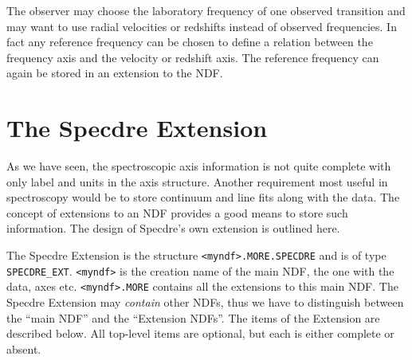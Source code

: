 The observer may choose the laboratory frequency of one observed transition and
may want to use radial velocities or redshifts instead of observed frequencies.
In fact any reference frequency can be chosen to define a relation between the
frequency axis and the velocity or redshift axis. The reference frequency can
again be stored in an extension to the NDF.


\goodbreak
\section{The Specdre Extension}
\label{extension}

As we have seen, the spectroscopic axis information is not quite complete with
only label and units in the axis structure. Another requirement most useful in
spectroscopy would be to store continuum and line fits along with the data. The
concept of extensions to an NDF provides a good means to store such
information. The design of Specdre's own extension is outlined here.

The Specdre Extension is the structure {\tt <myndf>.MORE.SPECDRE} and is
of type {\tt SPECDRE\_EXT}.
{\tt <myndf>} is the creation name of the main NDF, the one with the data, axes
etc. {\tt <myndf>.MORE} contains all the extensions to this main NDF. The
Specdre Extension may {\it contain} other NDFs, thus we have to distinguish
between the ``main NDF'' and the ``Extension NDFs''.
The items of the Extension are described below. All
top-level items are optional, but each is either complete or absent.

